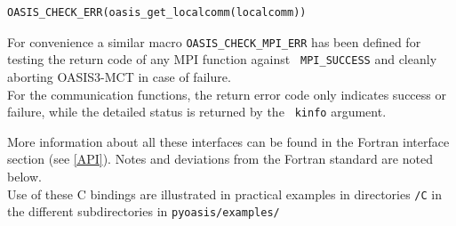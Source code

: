 \begin{verbatim}
OASIS_CHECK_ERR(oasis_get_localcomm(localcomm))
\end{verbatim}

For convenience a similar macro {\tt OASIS\_CHECK\_MPI\_ERR} has been
defined for testing the return code of any MPI function against {\tt
  MPI\_SUCCESS} and cleanly aborting OASIS3-MCT in case of failure.\\

For the communication functions, the return error code only indicates
success or failure, while the detailed status is returned by the {\tt
  kinfo} argument.

\vspace{0.2cm}
More information about all these interfaces can be found in the
Fortran interface section (see \ref{API}).  Notes and deviations from
the Fortran standard are noted below.\\
Use of these C bindings are illustrated in practical examples in
directories {\tt /C} in the different subdirectories in {\tt pyoasis/examples/}

